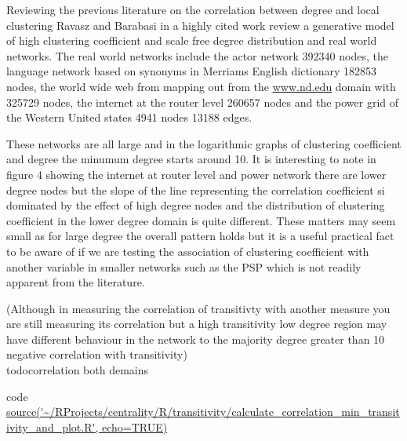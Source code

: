 Reviewing the previous literature on the correlation between degree and local clustering Ravasz and Barabasi in a highly cited work \cite{ravasz2002hierarchical} review a generative model of high clustering coefficient and scale free degree distribution and real world networks. The real world networks include the actor network 392340 nodes, the language network based on synonyms in Merriams English dictionary 182853 nodes, the world wide web from mapping out from the \url{www.nd.edu} domain with 325729 nodes, the internet at the router level 260657 nodes and the power grid of the Western United states 4941 nodes 13188 edges.

These networks are all large and in the logarithmic graphs of clustering coefficient and degree the minumum degree starts around 10. It is interesting to note in figure 4 showing the internet at router level and power network there are lower degree nodes but the slope of the line representing the correlation coefficient si dominated by the effect of high degree nodes and the distribution of clustering coefficient in the lower degree domain is quite different. These matters may seem small as for large degree the overall pattern holds but it is a useful practical fact to be aware of if we are testing the association of clustering coefficient with another variable in smaller networks such as the PSP which is not readily apparent from the literature.

(Although in measuring the correlation of transitivty with another measure you are still measuring its correlation but a high transitivity low degree region may have different behaviour in the network to the majority degree greater than 10 negative correlation with transitivity)\\todo{correlation both demains}

code \url{source('~/RProjects/centrality/R/transitivity/calculate_correlation_min_transitivity_and_plot.R', echo=TRUE)}

